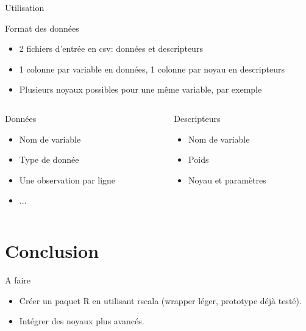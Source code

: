 \documentclass{beamer}
\begin{document}
\begin{frame}{Utilisation}
	\begin{block}{Format des données}
		\begin{itemize}
			\item 2 fichiers d'entrée en csv: données et descripteurs
			\item 1 colonne par variable en données, 1 colonne par noyau en descripteurs
			\item Plusieurs noyaux possibles pour une même variable, par exemple
		\end{itemize}
	\end{block}
	\begin{columns}
		\begin{column}{0.45\textwidth}
			\begin{block}{Données}
				\begin{itemize}
					\item Nom de variable
					\item Type de donnée
					\item Une observation par ligne
					\item ...
				\end{itemize}
			\end{block}
		\end{column}
		\begin{column}{0.45\textwidth}
			\begin{block}{Descripteurs}
				\begin{itemize}
					\item Nom de variable
					\item Poids
					\item Noyau et paramètres
				\end{itemize}
			\end{block}
		\end{column}
	\end{columns}
\end{frame}

\section{Conclusion}

\begin{frame}{A faire}
	\begin{itemize}
		\item Créer un paquet R en utilisant rscala (wrapper léger, prototype déjà testé).
		\item Intégrer des noyaux plus avancés.
	\end{itemize}
\end{frame}
\end{document}
